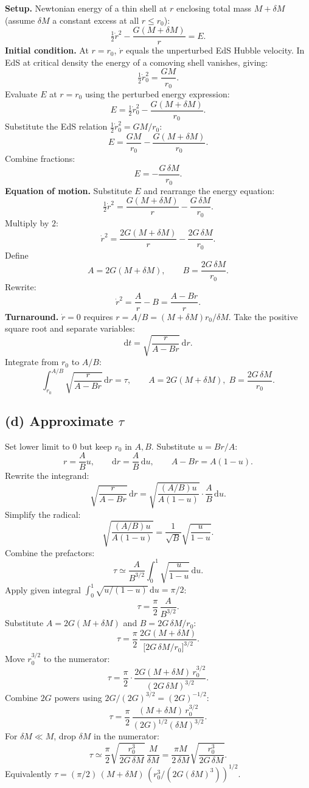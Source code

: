 \documentclass[11pt]{article}
\newcommand{\de}{\mathrm{d}}
\begin{document}
\textbf{Setup.} Newtonian energy of a thin shell at $r$ enclosing total mass $M+\delta M$ (assume $\delta M$ a constant excess at all $r\le r_0$):
\[ \tfrac12\dot r^2-\frac{G(M+\delta M)}{r}=E. \]
\textbf{Initial condition.} At $r=r_0$, $\dot r$ equals the unperturbed EdS Hubble velocity. In EdS at critical density the energy of a comoving shell vanishes, giving:
\[ \tfrac12\dot r_0^2=\frac{GM}{r_0}. \]
Evaluate $E$ at $r=r_0$ using the perturbed energy expression:
\[ E=\tfrac12\dot r_0^2-\frac{G(M+\delta M)}{r_0}. \]
Substitute the EdS relation $\tfrac12\dot r_0^2=GM/r_0$:
\[ E=\frac{GM}{r_0}-\frac{G(M+\delta M)}{r_0}. \]
Combine fractions:
\[ E=-\frac{G\,\delta M}{r_0}. \]
\textbf{Equation of motion.} Substitute $E$ and rearrange the energy equation:
\[ \tfrac12\dot r^2=\frac{G(M+\delta M)}{r}-\frac{G\,\delta M}{r_0}. \]
Multiply by $2$:
\[ \dot r^2=\frac{2G(M+\delta M)}{r}-\frac{2G\,\delta M}{r_0}. \]
Define
\[ A=2G(M+\delta M),\qquad B=\frac{2G\,\delta M}{r_0}. \]
Rewrite:
\[ \dot r^2=\frac{A}{r}-B=\frac{A-Br}{r}. \]
\textbf{Turnaround.} $\dot r=0$ requires $r=A/B=(M+\delta M)r_0/\delta M$. Take the positive square root and separate variables:
\[ \de t=\sqrt{\frac{r}{A-Br}}\,\de r. \]
Integrate from $r_0$ to $A/B$:
\begin{equation}
\boxed{\;\int_{r_0}^{A/B}\!\sqrt{\frac{r}{A-Br}}\,\de r=\tau,\qquad A=2G(M+\delta M),\;B=\frac{2G\,\delta M}{r_0}.\;}
\label{eq:turnaround-int}
\end{equation}

\subsection*{(d) Approximate $\tau$}

Set lower limit to $0$ but keep $r_0$ in $A,B$. Substitute $u=Br/A$:
\[ r=\frac{A}{B}u,\qquad \de r=\frac{A}{B}\,\de u,\qquad A-Br=A(1-u). \]
Rewrite the integrand:
\[ \sqrt{\frac{r}{A-Br}}\,\de r=\sqrt{\frac{(A/B)u}{A(1-u)}}\cdot\frac{A}{B}\,\de u. \]
Simplify the radical:
\[ \sqrt{\frac{(A/B)u}{A(1-u)}}=\frac{1}{\sqrt{B}}\sqrt{\frac{u}{1-u}}. \]
Combine the prefactors:
\[ \tau\simeq\frac{A}{B^{3/2}}\int_0^1\!\sqrt{\frac{u}{1-u}}\,\de u. \]
Apply given integral $\int_0^1\!\sqrt{u/(1-u)}\,\de u=\pi/2$:
\[ \tau=\frac{\pi}{2}\,\frac{A}{B^{3/2}}. \]
Substitute $A=2G(M+\delta M)$ and $B=2G\,\delta M/r_0$:
\[ \tau=\frac{\pi}{2}\,\frac{2G(M+\delta M)}{\bigl[2G\,\delta M/r_0\bigr]^{3/2}}. \]
Move $r_0^{3/2}$ to the numerator:
\[ \tau=\frac{\pi}{2}\cdot\frac{2G(M+\delta M)\,r_0^{3/2}}{(2G\,\delta M)^{3/2}}. \]
Combine $2G$ powers using $2G/(2G)^{3/2}=(2G)^{-1/2}$:
\[ \tau=\frac{\pi}{2}\,\frac{(M+\delta M)\,r_0^{3/2}}{(2G)^{1/2}(\delta M)^{3/2}}. \]
For $\delta M\ll M$, drop $\delta M$ in the numerator:
\begin{equation}
\boxed{\;\tau\simeq\frac{\pi}{2}\sqrt{\frac{r_0^{3}}{2G\,\delta M}}\,\frac{M}{\delta M}=\frac{\pi M}{2\,\delta M}\sqrt{\frac{r_0^{3}}{2G\,\delta M}}.\;}
\label{eq:tau-final}
\end{equation}
Equivalently $\tau=(\pi/2)\,(M+\delta M)\,(r_0^3/(2G(\delta M)^3))^{1/2}$.
\end{document}
